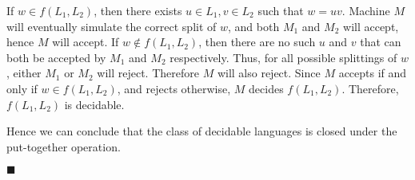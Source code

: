 \documentclass[a4paper]{exam}
\begin{document}
\begin{questions}
\begin{solution}
    If $w \in f(L_1, L_2)$, then there exists $ u \in L_1, v\in L_2 $ such that $ w = uv $. Machine $M$ will eventually simulate the correct split of $w$, and both $ M_1 $ and $M_2$ will accept, hence $M$ will accept. If $ w \notin f(L_1, L_2) $, then there are no such $ u $ and $ v $ that can both be accepted by $M_1$ and $M_2$ respectively. Thus, for all possible splittings of $w$, either $M_1$ or $M_2$ will reject. Therefore $M$ will also reject. Since $M$ accepts if and only if $w \in f(L_1, L_2)$, and rejects otherwise, $M$ decides $f(L_1, L_2)$. Therefore, $f(L_1, L_2)$ is decidable.

    Hence we can conclude that the class of decidable languages is closed under the put-together operation. \vspace*{-4mm}
    \begin{flushright}
      $\blacksquare$
    \end{flushright}
  \end{solution}

\end{questions}
\end{document}
